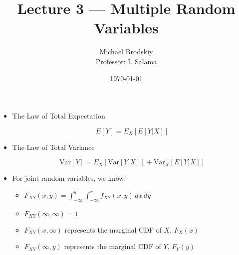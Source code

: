


\title{Lecture 3 — Multiple Random Variables}
\date{\today}
\author{Michael Brodskiy\\ \small Professor: I. Salama}



\maketitle

\begin{itemize}

  \item The Law of Total Expectation

    $$E[Y]=E_X[E[Y|X]]$$

  \item The Law of Total Variance

    $$\text{Var}[Y]=E_X[\text{Var}[Y|X]]+\text{Var}_X[E[Y|X]]$$

  \item For joint random variables, we know:

    \begin{itemize}

      \item $F_{XY}(x,y)=\displaystyle \int_{-\infty}^y\int_{-\infty}^x f_{XY}(x,y)\,dx\,dy$

      \item $F_{XY}(\infty,\infty)=1$

      \item $F_{XY}(x,\infty)$ represents the marginal CDF of $X$, $F_X(x)$

      \item $F_{XY}(\infty,y)$ represents the marginal CDF of $Y$, $F_Y(y)$

    \end{itemize}

\end{itemize}



